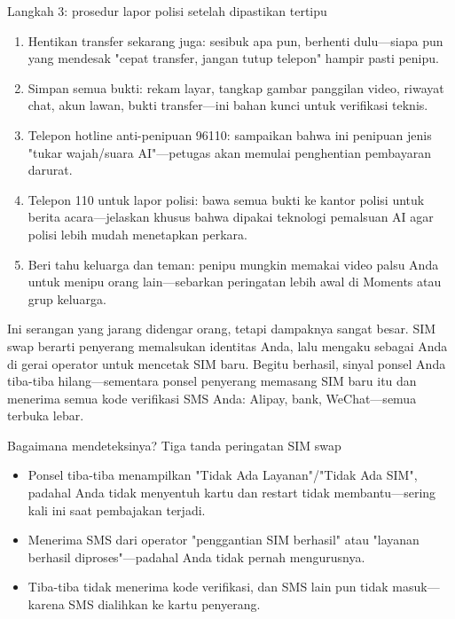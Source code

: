 \begin{tcbwarn}{Langkah 3: prosedur lapor polisi setelah dipastikan tertipu}
\begin{enumerate}
  \item Hentikan transfer sekarang juga: sesibuk apa pun, berhenti dulu—siapa pun yang mendesak "cepat transfer, jangan tutup telepon" hampir pasti penipu.
  \item Simpan semua bukti: rekam layar, tangkap gambar panggilan video, riwayat chat, akun lawan, bukti transfer—ini bahan kunci untuk verifikasi teknis.
  \item Telepon hotline anti-penipuan 96110: sampaikan bahwa ini penipuan jenis "tukar wajah/suara AI"—petugas akan memulai penghentian pembayaran darurat.
  \item Telepon 110 untuk lapor polisi: bawa semua bukti ke kantor polisi untuk berita acara—jelaskan khusus bahwa dipakai teknologi pemalsuan AI agar polisi lebih mudah menetapkan perkara.
  \item Beri tahu keluarga dan teman: penipu mungkin memakai video palsu Anda untuk menipu orang lain—sebarkan peringatan lebih awal di Moments atau grup keluarga.
\end{enumerate}

\end{tcbwarn}


Ini serangan yang jarang didengar orang, tetapi dampaknya sangat besar. SIM swap berarti penyerang memalsukan identitas Anda, lalu mengaku sebagai Anda di gerai operator untuk mencetak SIM baru. Begitu berhasil, sinyal ponsel Anda tiba-tiba hilang—sementara ponsel penyerang memasang SIM baru itu dan menerima semua kode verifikasi SMS Anda: Alipay, bank, WeChat—semua terbuka lebar.

\begin{tcbinfo}{Bagaimana mendeteksinya? Tiga tanda peringatan SIM swap}
\begin{itemize}
  \item Ponsel tiba-tiba menampilkan "Tidak Ada Layanan"/"Tidak Ada SIM", padahal Anda tidak menyentuh kartu dan restart tidak membantu—sering kali ini saat pembajakan terjadi.
  \item Menerima SMS dari operator "penggantian SIM berhasil" atau "layanan berhasil diproses"—padahal Anda tidak pernah mengurusnya.
  \item Tiba-tiba tidak menerima kode verifikasi, dan SMS lain pun tidak masuk—karena SMS dialihkan ke kartu penyerang.
\end{itemize}

\end{tcbinfo}


